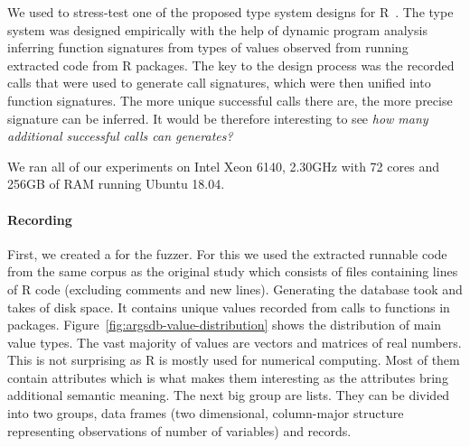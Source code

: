 \documentclass[sigplan,anonymous,review]{acmart}
\begin{document}
We used \tool to stress-test one of the proposed type system designs for R~\cite{turcotte2020designing}.
The type system was designed empirically with the help of dynamic program analysis inferring function signatures from types of values observed from running extracted code from R packages.
The key to the design process was the recorded calls that were used to generate call signatures, which were then unified into function signatures.
The more unique successful calls there are, the more precise signature can be inferred.
It would be therefore interesting to see \emph{how many additional successful calls can \tool generates?}

We ran all of our experiments on Intel Xeon 6140, 2.30GHz with 72 cores and 256GB of RAM running Ubuntu 18.04.

\paragraph{Recording}

First, we created a \sxpdb for the fuzzer.
For this we used the extracted runnable code from the same corpus as the original study which consists of \DBNumSourceFiles files containing \DBSourceLinesOfCodeRnd lines of R code (excluding comments and new lines).
Generating the database took  and takes \DBFileSize of disk space.
It contains \DBValuesRnd unique values recorded from \DBNumCallsRnd calls to \DBNumFunctionsRnd functions in \DBNumPackages packages.
Figure~\ref{fig:argsdb-value-distribution} shows the distribution of main value types.
The vast majority of values are vectors and matrices of real numbers.
This is not surprising as R is mostly used for numerical computing.
Most of them  contain attributes which is what makes them interesting as the attributes bring additional semantic meaning.
The next big group are lists.
They can be divided into two groups, data frames (two dimensional, column-major structure representing observations of number of variables) and records.
\end{document}
